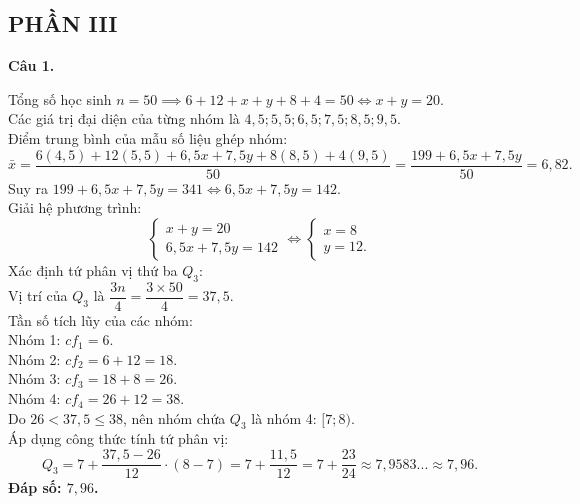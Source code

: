 \documentclass[12pt,a4paper]{article}
\newcommand{\loigiai}[1]{\par\medskip\Needspace{4\baselineskip}\noindent\textbf{#1}\par\nobreak}
\begin{document}
\subsection*{PHẦN III}

\loigiai{Câu 1.}
Tổng số học sinh $n = 50 \implies 6 + 12 + x + y + 8 + 4 = 50 \iff x + y = 20$.\\
Các giá trị đại diện của từng nhóm là $4{,}5; 5{,}5; 6{,}5; 7{,}5; 8{,}5; 9{,}5$.\\
Điểm trung bình của mẫu số liệu ghép nhóm:
$$\bar{x} = \dfrac{6(4{,}5) + 12(5{,}5) + 6{,}5x + 7{,}5y + 8(8{,}5) + 4(9{,}5)}{50} = \dfrac{199 + 6{,}5x + 7{,}5y}{50} = 6{,}82.$$
Suy ra $199 + 6{,}5x + 7{,}5y = 341 \iff 6{,}5x + 7{,}5y = 142$.\\
Giải hệ phương trình:
$$\begin{cases} x + y = 20 \\ 6{,}5x + 7{,}5y = 142 \end{cases} \iff \begin{cases} x = 8 \\ y = 12. \end{cases}$$
Xác định tứ phân vị thứ ba $Q_3$:\\
Vị trí của $Q_3$ là $\dfrac{3n}{4} = \dfrac{3 \times 50}{4} = 37{,}5$.\\
Tần số tích lũy của các nhóm:\\
Nhóm 1: $cf_1 = 6$.\\
Nhóm 2: $cf_2 = 6 + 12 = 18$.\\
Nhóm 3: $cf_3 = 18 + 8 = 26$.\\
Nhóm 4: $cf_4 = 26 + 12 = 38$.\\
Do $26 < 37{,}5 \le 38$, nên nhóm chứa $Q_3$ là nhóm 4: $[7; 8)$.\\
Áp dụng công thức tính tứ phân vị:
$$Q_3 = 7 + \dfrac{37{,}5 - 26}{12} \cdot (8 - 7) = 7 + \dfrac{11{,}5}{12} = 7 + \dfrac{23}{24} \approx 7{,}9583... \approx 7{,}96.$$
\textbf{Đáp số: $7{,}96$.}
\end{document}
